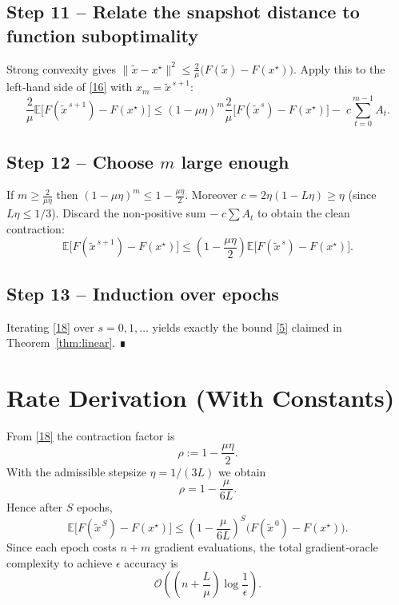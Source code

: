 \documentclass[11pt]{article}
\newcommand{\E}{\mathbb{E}}
\begin{document}
\subsection*{Step 11 – Relate the snapshot distance to function suboptimality}
Strong convexity gives $\| \tilde{x}-x^\star\|^{2}\le \frac{2}{\mu}\bigl(F(\tilde{x})-F(x^\star)\bigr)$. Apply this to the left‑hand side of \eqref{16} with $x_m=\tilde{x}^{\,s+1}$:
\[
\frac{2}{\mu}\E\!\bigl[F(\tilde{x}^{\,s+1})-F(x^\star)\bigr]
\le (1-\mu\eta)^{m}\frac{2}{\mu}\bigl[F(\tilde{x}^{\,s})-F(x^\star)\bigr]
-\;c\sum_{t=0}^{m-1}A_t . \tag{17}
\]

\subsection*{Step 12 – Choose $m$ large enough}
If $m\ge \frac{2}{\mu\eta}$ then $(1-\mu\eta)^{m}\le 1-\frac{\mu\eta}{2}$. Moreover $c=2\eta(1-L\eta)\ge \eta$ (since $L\eta\le 1/3$). Discard the non‑positive sum $-\;c\sum A_t$ to obtain the clean contraction:
\[
\E\!\bigl[F(\tilde{x}^{\,s+1})-F(x^\star)\bigr]
\le\left(1-\frac{\mu\eta}{2}\right)
\E\!\bigl[F(\tilde{x}^{\,s})-F(x^\star)\bigr]. \tag{18}
\]

\subsection*{Step 13 – Induction over epochs}
Iterating \eqref{18} over $s=0,1,\dots$ yields exactly the bound \eqref{5} claimed in Theorem~\ref{thm:linear}. ∎

\section*{Rate Derivation (With Constants)}
From \eqref{18} the contraction factor is
\[
\rho:=1-\frac{\mu\eta}{2}.
\]
With the admissible stepsize $\eta=1/(3L)$ we obtain
\[
\rho=1-\frac{\mu}{6L}.
\]
Hence after $S$ epochs,
\[
\E\!\bigl[F(\tilde{x}^{\,S})-F(x^\star)\bigr]
\le\left(1-\frac{\mu}{6L}\right)^{S}
\bigl(F(\tilde{x}^{\,0})-F(x^\star)\bigr).
\]
Since each epoch costs $n+m$ gradient evaluations, the total gradient‑oracle complexity to achieve $\epsilon$ accuracy is
\[
\mathcal{O}\!\left(\left(n+\frac{L}{\mu}\right)\log\frac{1}{\epsilon}\right).
\]

\end{document}
